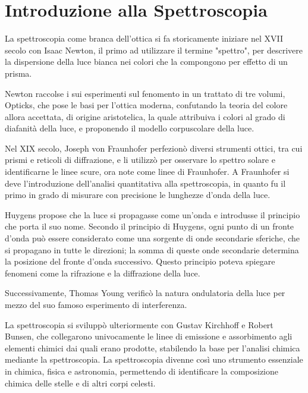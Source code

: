 \documentclass[12pt,a4paper]{report}
\begin{document}
\chapter{Introduzione alla Spettroscopia}

La spettroscopia come branca dell'ottica si fa storicamente iniziare nel XVII secolo con Isaac Newton, il primo ad utilizzare il termine "spettro", per descrivere la dispersione della luce bianca nei colori che la compongono per effetto di un prisma\cite{Newton1671}.

Newton raccolse i sui esperimenti sul fenomento in un trattato di tre volumi, Opticks\cite{newton1704opticks}, che pose le basi per l'ottica moderna, confutando la teoria del colore allora accettata, di origine aristotelica, la quale attribuiva i colori al grado di diafanità della luce\cite{boscarol2024}, e proponendo il modello corpuscolare della luce.

Nel XIX secolo, Joseph von Fraunhofer perfezionò diversi strumenti ottici, tra cui prismi e reticoli di diffrazione, e li utilizzò per osservare lo spettro solare e identificarne le linee scure, ora note come linee di Fraunhofer\cite{Fraunhofer1817}. A Fraunhofer si deve l'introduzione dell'analisi quantitativa alla spettroscopia, in quanto fu il primo in grado di misurare con precisione le lunghezze d'onda della luce.

Huygens propose che la luce si propagasse come un'onda e introdusse il principio che porta il suo nome\cite{Huygens1690}. Secondo il principio di Huygens, ogni punto di un fronte d'onda può essere considerato come una sorgente di onde secondarie sferiche, che si propagano in tutte le direzioni; la somma di queste onde secondarie determina la posizione del fronte d'onda successivo. Questo principio poteva spiegare fenomeni come la rifrazione e la diffrazione della luce.

Successivamente, Thomas Young verificò la natura ondulatoria della luce per mezzo del suo famoso esperimento di interferenza\cite{Young1804}.

La spettroscopia si sviluppò ulteriormente con Gustav Kirchhoff e Robert Bunsen, che collegarono univocamente le linee di emissione e assorbimento agli elementi chimici dai quali erano prodotte\cite{Kirchhoff1861}, stabilendo la base per l'analisi chimica mediante la spettroscopia. La spettroscopia divenne così uno strumento essenziale in chimica, fisica e astronomia, permettendo di identificare la composizione chimica delle stelle e di altri corpi celesti.
\end{document}
